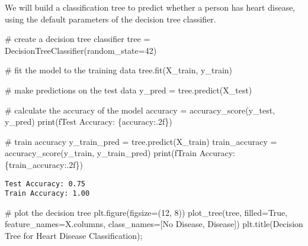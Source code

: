 \documentclass[
  letterpaper,
  DIV=11,
  numbers=noendperiod]{scrreprt}
\newenvironment{Shaded}{\begin{snugshade}}{\end{snugshade}}
\newcommand{\BuiltInTok}[1]{\textcolor[rgb]{0.00,0.23,0.31}{#1}}
\newcommand{\CommentTok}[1]{\textcolor[rgb]{0.37,0.37,0.37}{#1}}
\newcommand{\DecValTok}[1]{\textcolor[rgb]{0.68,0.00,0.00}{#1}}
\newcommand{\NormalTok}[1]{\textcolor[rgb]{0.00,0.23,0.31}{#1}}
\newcommand{\OperatorTok}[1]{\textcolor[rgb]{0.37,0.37,0.37}{#1}}
\newcommand{\SpecialCharTok}[1]{\textcolor[rgb]{0.37,0.37,0.37}{#1}}
\newcommand{\SpecialStringTok}[1]{\textcolor[rgb]{0.13,0.47,0.30}{#1}}
\newcommand{\StringTok}[1]{\textcolor[rgb]{0.13,0.47,0.30}{#1}}
\newcommand{\VariableTok}[1]{\textcolor[rgb]{0.07,0.07,0.07}{#1}}
\begin{document}
We will build a classification tree to predict whether a person has
heart disease, using the default parameters of the decision tree
classifier.

\begin{Shaded}
\begin{Highlighting}[]
\CommentTok{\# create a decision tree classifier}
\NormalTok{tree }\OperatorTok{=}\NormalTok{ DecisionTreeClassifier(random\_state}\OperatorTok{=}\DecValTok{42}\NormalTok{)}

\CommentTok{\# fit the model to the training data}
\NormalTok{tree.fit(X\_train, y\_train)}

\CommentTok{\# make predictions on the test data}
\NormalTok{y\_pred }\OperatorTok{=}\NormalTok{ tree.predict(X\_test)}

\CommentTok{\# calculate the accuracy of the model}
\NormalTok{accuracy }\OperatorTok{=}\NormalTok{ accuracy\_score(y\_test, y\_pred)}
\BuiltInTok{print}\NormalTok{(}\SpecialStringTok{f\textquotesingle{}Test Accuracy: }\SpecialCharTok{\{}\NormalTok{accuracy}\SpecialCharTok{:.2f\}}\SpecialStringTok{\textquotesingle{}}\NormalTok{)}

\CommentTok{\# train accuracy}
\NormalTok{y\_train\_pred }\OperatorTok{=}\NormalTok{ tree.predict(X\_train)}
\NormalTok{train\_accuracy }\OperatorTok{=}\NormalTok{ accuracy\_score(y\_train, y\_train\_pred)}
\BuiltInTok{print}\NormalTok{(}\SpecialStringTok{f\textquotesingle{}Train Accuracy: }\SpecialCharTok{\{}\NormalTok{train\_accuracy}\SpecialCharTok{:.2f\}}\SpecialStringTok{\textquotesingle{}}\NormalTok{)}
\end{Highlighting}
\end{Shaded}

\begin{verbatim}
Test Accuracy: 0.75
Train Accuracy: 1.00
\end{verbatim}

\begin{Shaded}
\begin{Highlighting}[]
\CommentTok{\# plot the decision tree}
\NormalTok{plt.figure(figsize}\OperatorTok{=}\NormalTok{(}\DecValTok{12}\NormalTok{, }\DecValTok{8}\NormalTok{))}
\NormalTok{plot\_tree(tree, filled}\OperatorTok{=}\VariableTok{True}\NormalTok{, feature\_names}\OperatorTok{=}\NormalTok{X.columns, class\_names}\OperatorTok{=}\NormalTok{[}\StringTok{\textquotesingle{}No Disease\textquotesingle{}}\NormalTok{, }\StringTok{\textquotesingle{}Disease\textquotesingle{}}\NormalTok{])}
\NormalTok{plt.title(}\StringTok{\textquotesingle{}Decision Tree for Heart Disease Classification\textquotesingle{}}\NormalTok{)}\OperatorTok{;}
\end{Highlighting}
\end{Shaded}
\end{document}
